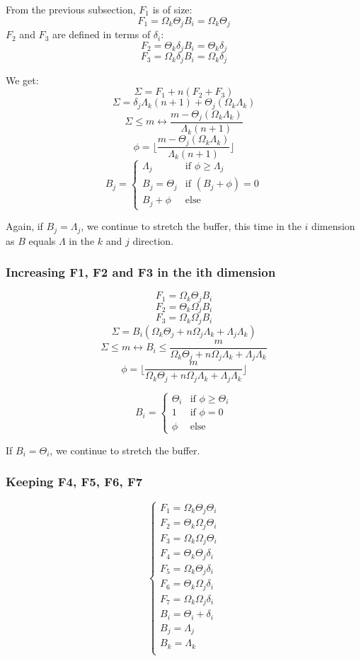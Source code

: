 \documentclass[conference]{IEEEtran}
\begin{document}
From the previous subsection, $F_1$ is of size:
$$F_1 = \Omega_k \Theta_j B_i = \Omega_k \Theta_j$$
$F_2$ and $F_3$ are defined in terms of $\delta_i$:
$$F_2 = \Theta_k \delta_j B_i = \Theta_k \delta_j$$
$$F_3 = \Omega_k \delta_j B_i = \Omega_k \delta_j$$

We get:
$$\Sigma = F_1 + n(F_2+F_3)$$
$$\Sigma = \delta_j\Lambda_k(n+1) + \Theta_j(\Omega_k\Lambda_k)$$
$$\Sigma \leq m \leftrightarrow \frac{m-\Theta_j(\Omega_k\Lambda_k)}{\Lambda_k(n+1)}$$
$$\phi = \lfloor \frac{m-\Theta_j(\Omega_k\Lambda_k)}{\Lambda_k(n+1)} \rfloor$$
$$B_j = \begin{cases}
  \Lambda_j & \textrm{if }\phi \geq \Lambda_j \\
  B_j = \Theta_j & \textrm{if }(B_j+\phi) = 0 \\
  B_j + \phi & \textrm{else}
\end{cases}$$

Again, if $B_j=\Lambda_j$, we continue to stretch the buffer, this time in the
$i$ dimension as $B$ equals $\Lambda$ in the $k$ and $j$ direction.

\subsubsection{Increasing F1, F2 and F3 in the ith dimension}
$$F_1 = \Omega_k\Theta_jB_i$$
$$F_2 = \Theta_k\Omega_jB_i$$
$$F_3 = \Omega_k\Omega_jB_i$$
$$\Sigma = B_i(\Omega_k\Theta_j + n\Omega_j\Lambda_k + \Lambda_j\Lambda_k)$$
$$\Sigma \leq m \leftrightarrow B_i \leq \frac{m}{\Omega_k\Theta_j + n\Omega_j\Lambda_k + \Lambda_j\Lambda_k}$$
$$\phi = \lfloor \frac{m}{\Omega_k\Theta_j + n\Omega_j\Lambda_k + \Lambda_j\Lambda_k} \rfloor$$

$$B_i = \begin{cases}
  \Theta_i & \textrm{if }\phi \geq \Theta_i \\
  1 & \textrm{if }\phi = 0 \\
  \phi & \textrm{else}
\end{cases}$$

If $B_i=\Theta_i$, we continue to stretch the buffer.

\subsubsection{Keeping F4, F5, F6, F7}

$$\begin{cases}
  F_1 = \Omega_k\Theta_j\Theta_i \\
  F_2 = \Theta_k\Omega_j\Theta_i \\
  F_3 = \Omega_k\Omega_j\Theta_i \\
  F_4 = \Theta_k\Theta_j\delta_i \\
  F_5 = \Omega_k\Theta_j\delta_i \\
  F_6 = \Theta_k\Omega_j\delta_i \\
  F_7 = \Omega_k\Omega_j\delta_i \\
  B_i = \Theta_i + \delta_i \\
  B_j = \Lambda_j\\
  B_k = \Lambda_k\\
\end{cases}$$
\end{document}
